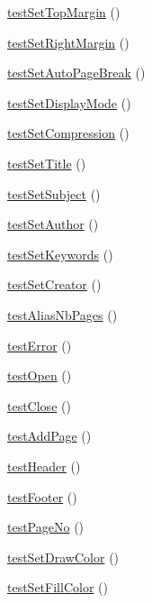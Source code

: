 \begin{DoxyCompactItemize}
\item 
\hyperlink{class_f_p_d_f_test_abadbc3bb2d33de5cf0c683b6079381df}{testSetTopMargin} ()
\item 
\hyperlink{class_f_p_d_f_test_aa3d7e46363f0f6c3a7ee5d336999aa47}{testSetRightMargin} ()
\item 
\hyperlink{class_f_p_d_f_test_a538458c657bb68bc14fa0867fb5f26d2}{testSetAutoPageBreak} ()
\item 
\hyperlink{class_f_p_d_f_test_ae36fa8e2ac120c6047095132f6702b99}{testSetDisplayMode} ()
\item 
\hyperlink{class_f_p_d_f_test_a8ebed7f7815638ce4ab1e59c5b330989}{testSetCompression} ()
\item 
\hyperlink{class_f_p_d_f_test_a71aa9259f5ade449ddbe4e05316eff14}{testSetTitle} ()
\item 
\hyperlink{class_f_p_d_f_test_aabc48b3677f12ba2ed44aff54514cd64}{testSetSubject} ()
\item 
\hyperlink{class_f_p_d_f_test_a994fab439102f0b00d4e6338f8f43338}{testSetAuthor} ()
\item 
\hyperlink{class_f_p_d_f_test_a7a1a10bdc85a6038cf3272689d0e8b9c}{testSetKeywords} ()
\item 
\hyperlink{class_f_p_d_f_test_a3f1c075d3b84a45f8aa62a51df8e9313}{testSetCreator} ()
\item 
\hyperlink{class_f_p_d_f_test_a6ee64c62a92b0448d22a55994bd1a3cd}{testAliasNbPages} ()
\item 
\hyperlink{class_f_p_d_f_test_a3e018a623c05ac45934f76f3a84ef6e5}{testError} ()
\item 
\hyperlink{class_f_p_d_f_test_a3b5ce735913ae531cbdeaadbfa062241}{testOpen} ()
\item 
\hyperlink{class_f_p_d_f_test_adca50b30895ba89d735672fad56f6b0d}{testClose} ()
\item 
\hyperlink{class_f_p_d_f_test_a2d6010027612171bc7a537a60f4faa85}{testAddPage} ()
\item 
\hyperlink{class_f_p_d_f_test_a19b6fc728e839dc11d0e1a51de611b5e}{testHeader} ()
\item 
\hyperlink{class_f_p_d_f_test_ab59f9affc99c4a139bb4a2a59eb671a6}{testFooter} ()
\item 
\hyperlink{class_f_p_d_f_test_a17eedcf2cff8ca7679f512b54ce939bc}{testPageNo} ()
\item 
\hyperlink{class_f_p_d_f_test_a9fef98ec07c3c5af5a9b295a34fe0a32}{testSetDrawColor} ()
\item 
\hyperlink{class_f_p_d_f_test_a08cff29015594e20886053b7ae7cc897}{testSetFillColor} ()

\end{DoxyCompactItemize}
